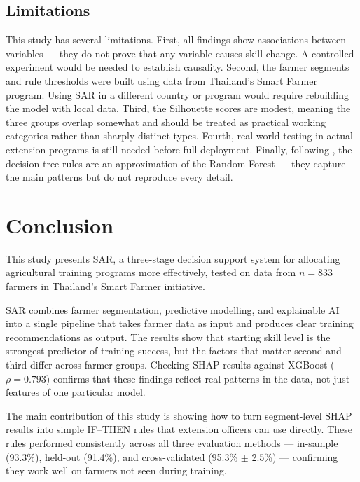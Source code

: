 \documentclass[fleqn,10pt,lineno]{wlpeerj}
\begin{document}
\subsection{Limitations}

This study has several limitations. First, all findings show 
associations between variables — they do not prove that any 
variable causes skill change. A controlled experiment would be 
needed to establish causality. Second, the farmer segments and 
rule thresholds were built using data from Thailand's Smart 
Farmer program. Using SAR in a different country or program 
would require rebuilding the model with local data. Third, the 
Silhouette scores are modest, meaning the three groups overlap 
somewhat and should be treated as practical working categories 
rather than sharply distinct types. Fourth, real-world testing 
in actual extension programs is still needed before full 
deployment. Finally, following \citet{rudin2019}, the decision 
tree rules are an approximation of the Random Forest — they 
capture the main patterns but do not reproduce every detail.

\section{Conclusion}

This study presents SAR, a three-stage decision support system 
for allocating agricultural training programs more effectively, 
tested on data from $n = 833$ farmers in Thailand's Smart Farmer 
initiative.

SAR combines farmer segmentation, predictive modelling, and 
explainable AI into a single pipeline that takes farmer data as 
input and produces clear training recommendations as output. The 
results show that starting skill level is the strongest predictor 
of training success, but the factors that matter second and third 
differ across farmer groups. Checking SHAP results against 
XGBoost ($\rho = 0.793$) confirms that these findings reflect 
real patterns in the data, not just features of one particular 
model.

The main contribution of this study is showing how to turn 
segment-level SHAP results into simple IF--THEN rules that 
extension officers can use directly. These rules performed 
consistently across all three evaluation methods — in-sample 
(93.3\%), held-out (91.4\%), and cross-validated 
(95.3\% $\pm$ 2.5\%) — confirming they work well on farmers 
not seen during training.
\end{document}
